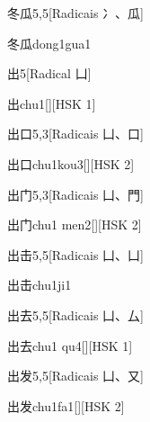 \begin{entry}{冬瓜}{5,5}[Radicais ⼎、⽠]
  \begin{phonetics}{冬瓜}{dong1gua1}
  \end{phonetics}
\end{entry}

\begin{entry}{出}{5}[Radical ⼐]
  \begin{phonetics}{出}{chu1}[][HSK 1]
  \end{phonetics}
\end{entry}

\begin{entry}{出口}{5,3}[Radicais ⼐、⼝]
  \begin{phonetics}{出口}{chu1kou3}[][HSK 2]
  \end{phonetics}
\end{entry}

\begin{entry}{出门}{5,3}[Radicais ⼐、⾨]
  \begin{phonetics}{出门}{chu1 men2}[][HSK 2]
  \end{phonetics}
\end{entry}

\begin{entry}{出击}{5,5}[Radicais ⼐、⼐]
  \begin{phonetics}{出击}{chu1ji1}
  \end{phonetics}
\end{entry}

\begin{entry}{出去}{5,5}[Radicais ⼐、⼛]
  \begin{phonetics}{出去}{chu1 qu4}[][HSK 1]
  \end{phonetics}
\end{entry}

\begin{entry}{出发}{5,5}[Radicais ⼐、⼜]
  \begin{phonetics}{出发}{chu1fa1}[][HSK 2]
  \end{phonetics}
\end{entry}

